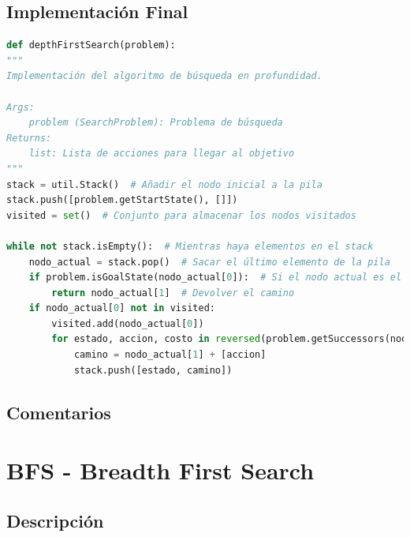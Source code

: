\documentclass{report}
\begin{document}
        \subsection*{Implementación Final}
          \begin{lstlisting}[language=Python, caption=Implementación final del DFS]
def depthFirstSearch(problem):
"""
Implementación del algoritmo de búsqueda en profundidad.

Args:
    problem (SearchProblem): Problema de búsqueda
Returns:
    list: Lista de acciones para llegar al objetivo
"""
stack = util.Stack()  # Añadir el nodo inicial a la pila
stack.push([problem.getStartState(), []])
visited = set()  # Conjunto para almacenar los nodos visitados

while not stack.isEmpty():  # Mientras haya elementos en el stack
    nodo_actual = stack.pop()  # Sacar el último elemento de la pila
    if problem.isGoalState(nodo_actual[0]):  # Si el nodo actual es el objetivo
        return nodo_actual[1]  # Devolver el camino
    if nodo_actual[0] not in visited:
        visited.add(nodo_actual[0])
        for estado, accion, costo in reversed(problem.getSuccessors(nodo_actual[0])): 
            camino = nodo_actual[1] + [accion]
            stack.push([estado, camino])
          \end{lstlisting}
        \subsection*{Comentarios}
          \paragraph*{}{

          }
      \clearpage\section{BFS - Breadth First Search}
        \subsection*{Descripción}
          \paragraph*{}{

          }
\end{document}
